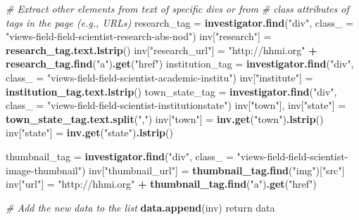 \documentclass[]{krantz}
\newenvironment{Shaded}{\begin{snugshade}}{\end{snugshade}}
\newcommand{\KeywordTok}[1]{\textcolor[rgb]{0.13,0.29,0.53}{\textbf{#1}}}
\newcommand{\DataTypeTok}[1]{\textcolor[rgb]{0.13,0.29,0.53}{#1}}
\newcommand{\StringTok}[1]{\textcolor[rgb]{0.31,0.60,0.02}{#1}}
\newcommand{\CommentTok}[1]{\textcolor[rgb]{0.56,0.35,0.01}{\textit{#1}}}
\newcommand{\OperatorTok}[1]{\textcolor[rgb]{0.81,0.36,0.00}{\textbf{#1}}}
\newcommand{\NormalTok}[1]{#1}
\begin{document}
\begin{Shaded}
\begin{Highlighting}[]
       \CommentTok{# Extract other elements from text of specific divs or from}
       \CommentTok{# class attributes of tags in the page (e.g., URLs)}
\NormalTok{       research_tag =}\StringTok{ }\KeywordTok{investigator.find}\NormalTok{(}\StringTok{"div"}\NormalTok{,}
          \DataTypeTok{class_ =} \StringTok{"views-field-field-scientist-research-abs-nod"}\NormalTok{)}
\NormalTok{       inv[}\StringTok{"research"}\NormalTok{] =}\StringTok{ }\KeywordTok{research_tag.text.lstrip}\NormalTok{()}
\NormalTok{       inv[}\StringTok{"research_url"}\NormalTok{] =}\StringTok{ "http://hhmi.org"}
          \OperatorTok{+}\StringTok{ }\KeywordTok{research_tag.find}\NormalTok{(}\StringTok{"a"}\NormalTok{)}\KeywordTok{.get}\NormalTok{(}\StringTok{"href"}\NormalTok{)}
\NormalTok{       institution_tag =}\StringTok{ }\KeywordTok{investigator.find}\NormalTok{(}\StringTok{"div"}\NormalTok{,}
          \DataTypeTok{class_ =} \StringTok{"views-field-field-scientist-academic-institu"}\NormalTok{)}
\NormalTok{       inv[}\StringTok{"institute"}\NormalTok{] =}\StringTok{ }\KeywordTok{institution_tag.text.lstrip}\NormalTok{()}
\NormalTok{       town_state_tag =}\StringTok{ }\KeywordTok{investigator.find}\NormalTok{(}\StringTok{"div"}\NormalTok{,}
           \DataTypeTok{class_ =} \StringTok{"views-field-field-scientist-institutionstate"}\NormalTok{)}
\NormalTok{       inv[}\StringTok{"town"}\NormalTok{], inv[}\StringTok{"state"}\NormalTok{] =}\StringTok{ }\KeywordTok{town_state_tag.text.split}\NormalTok{(}\StringTok{","}\NormalTok{)}
\NormalTok{       inv[}\StringTok{"town"}\NormalTok{] =}\StringTok{ }\KeywordTok{inv.get}\NormalTok{(}\StringTok{"town"}\NormalTok{)}\KeywordTok{.lstrip}\NormalTok{()}
\NormalTok{       inv[}\StringTok{"state"}\NormalTok{] =}\StringTok{ }\KeywordTok{inv.get}\NormalTok{(}\StringTok{"state"}\NormalTok{)}\KeywordTok{.lstrip}\NormalTok{()}

\NormalTok{       thumbnail_tag =}\StringTok{ }\KeywordTok{investigator.find}\NormalTok{(}\StringTok{"div"}\NormalTok{,}
          \DataTypeTok{class_ =} \StringTok{"views-field-field-scientist-image-thumbnail"}\NormalTok{)}
\NormalTok{       inv[}\StringTok{"thumbnail_url"}\NormalTok{] =}\StringTok{ }\KeywordTok{thumbnail_tag.find}\NormalTok{(}\StringTok{"img"}\NormalTok{)[}\StringTok{"src"}\NormalTok{]}
\NormalTok{       inv[}\StringTok{"url"}\NormalTok{] =}\StringTok{ "http://hhmi.org"}
          \OperatorTok{+}\StringTok{ }\KeywordTok{thumbnail_tag.find}\NormalTok{(}\StringTok{"a"}\NormalTok{)}\KeywordTok{.get}\NormalTok{(}\StringTok{"href"}\NormalTok{)}

       \CommentTok{# Add the new data to the list}
       \KeywordTok{data.append}\NormalTok{(inv)}
\NormalTok{   return data}
\end{Highlighting}
\end{Shaded}
\end{document}
